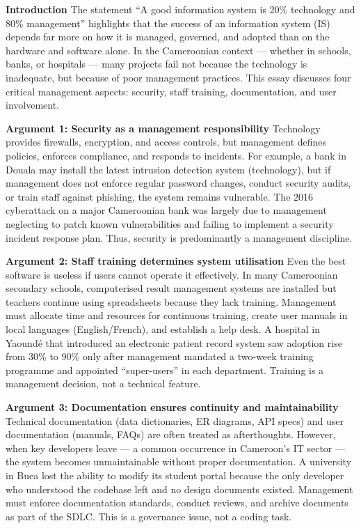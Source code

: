 \documentclass[11pt]{article}
\begin{document}
\begin{corrige}
\textbf{Introduction}
The statement ``A good information system is 20\% technology and 80\% management'' highlights that the success of an information system (IS) depends far more on how it is managed, governed, and adopted than on the hardware and software alone. In the Cameroonian context — whether in schools, banks, or hospitals — many projects fail not because the technology is inadequate, but because of poor management practices. This essay discusses four critical management aspects: security, staff training, documentation, and user involvement.

\textbf{Argument 1: Security as a management responsibility}
Technology provides firewalls, encryption, and access controls, but management defines policies, enforces compliance, and responds to incidents. For example, a bank in Douala may install the latest intrusion detection system (technology), but if management does not enforce regular password changes, conduct security audits, or train staff against phishing, the system remains vulnerable. The 2016 cyberattack on a major Cameroonian bank was largely due to management neglecting to patch known vulnerabilities and failing to implement a security incident response plan. Thus, security is predominantly a management discipline.

\textbf{Argument 2: Staff training determines system utilisation}
Even the best software is useless if users cannot operate it effectively. In many Cameroonian secondary schools, computerised result management systems are installed but teachers continue using spreadsheets because they lack training. Management must allocate time and resources for continuous training, create user manuals in local languages (English/French), and establish a help desk. A hospital in Yaoundé that introduced an electronic patient record system saw adoption rise from 30\% to 90\% only after management mandated a two-week training programme and appointed ``super-users'' in each department. Training is a management decision, not a technical feature.

\textbf{Argument 3: Documentation ensures continuity and maintainability}
Technical documentation (data dictionaries, ER diagrams, API specs) and user documentation (manuals, FAQs) are often treated as afterthoughts. However, when key developers leave — a common occurrence in Cameroon's IT sector — the system becomes unmaintainable without proper documentation. A university in Buea lost the ability to modify its student portal because the only developer who understood the codebase left and no design documents existed. Management must enforce documentation standards, conduct reviews, and archive documents as part of the SDLC. This is a governance issue, not a coding task.


\end{corrige}
\end{document}
